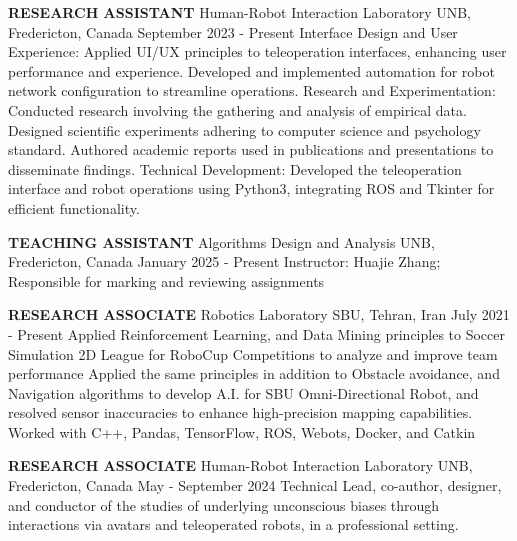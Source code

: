 
\begin{cventries}
    \cventry
    {\textbf{RESEARCH ASSISTANT}}
    {Human-Robot Interaction Laboratory}
    {UNB, Fredericton, Canada}
    {September 2023 - Present}
    {Interface Design and User Experience: Applied UI/UX principles to teleoperation interfaces, enhancing user performance and experience. Developed and implemented automation for robot network configuration to streamline operations.
    \newline Research and Experimentation: Conducted research involving the gathering and analysis of empirical data. Designed scientific experiments adhering to computer science and psychology standard. Authored academic reports used in publications and presentations to disseminate findings.
    \newline Technical Development: Developed the teleoperation interface and robot operations using Python3, integrating ROS and Tkinter for efficient functionality.
    }
    \vspace{0.4 cm}
\end{cventries}

\begin{cventries}
    \cventry
    {\textbf{TEACHING ASSISTANT}}
    {Algorithms Design and Analysis}
    {UNB, Fredericton, Canada}
    {January 2025 - Present}
    {Instructor: Huajie Zhang; Responsible for marking and reviewing assignments}
    \vspace{0.4 cm}
\end{cventries}


\begin{cventries}
    \cventry
    {\textbf {RESEARCH ASSOCIATE}}
    {Robotics Laboratory}
    {SBU, Tehran, Iran}
    {July 2021 - Present}
    {Applied Reinforcement Learning, and Data Mining principles to Soccer Simulation 2D League for RoboCup Competitions to analyze and improve team performance 
    \newline Applied the same principles in addition to Obstacle avoidance, and Navigation algorithms to develop A.I. for SBU Omni-Directional Robot, 
    and resolved sensor inaccuracies to enhance high-precision mapping capabilities.
    \newline Worked with C++, Pandas, TensorFlow, ROS, Webots, Docker, and Catkin}
    \vspace{0.4 cm}
\end{cventries}

\begin{cventries}
    \cventry
    {\textbf{RESEARCH ASSOCIATE}}
    {Human-Robot Interaction Laboratory}
    {UNB, Fredericton, Canada}
    {May - September 2024}
    {Technical Lead, co-author, designer, and conductor of the studies of underlying unconscious biases through interactions via avatars and teleoperated robots, in a professional setting.
    }
    \vspace{0.4 cm}
\end{cventries}

